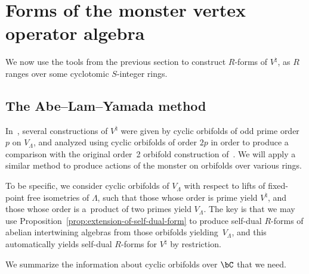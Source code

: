 \section{Forms of the monster vertex operator algebra}

We now use the tools from the previous section to construct $R$-forms of $V^\natural$, as $R$ ranges over some cyclotomic $S$-integer rings.

\subsection{The Abe--Lam--Yamada method}

In~\cite{ALY17}, several constructions of $V^\natural$ were given by cyclic orbifolds of odd prime order $p$ on $V_\Lambda$, and analyzed using cyclic orbifolds of order $2p$ in order to produce a comparison with the original order~2 orbifold construction of~\cite{FLM88}. We will apply a similar method to produce actions of the monster on orbifolds over various rings.

To be specific, we consider cyclic orbifolds of $V_\Lambda$ with respect to lifts of fixed-point free isometries of $\Lambda$, such that those whose order is prime yield $V^\natural$, and those whose order is a~product of two primes yield $V_\Lambda$. The key is that we may use Proposition~\ref{prop:extension-of-self-dual-form} to produce self-dual $R$-forms of abelian intertwining algebras from those orbifolds yielding~$V_\Lambda$, and this automatically yields self-dual $R$-forms for $V^\natural$ by restriction.

We summarize the information about cyclic orbifolds over $\bC$ that we need.


